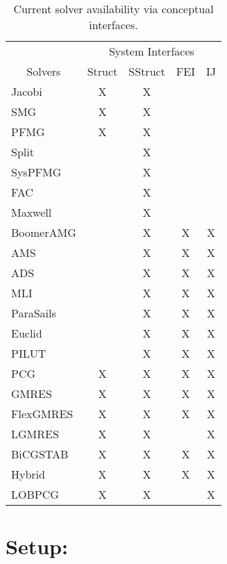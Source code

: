 \begin{table}[h]
\center
\begin{tabular}{|l||c|c|c|c|}
\hline
                               & \multicolumn{4}{|c|}{System Interfaces} \\
\multicolumn{1}{|c||}{Solvers} & Struct & SStruct & FEI & IJ \\
\hline\hline
Jacobi     & X & X &   &   \\
SMG        & X & X &   &   \\
PFMG       & X & X &   &   \\
Split      &   & X &   &   \\
SysPFMG    &   & X &   &   \\
FAC        &   & X &   &   \\
Maxwell    &   & X &   &   \\
BoomerAMG  &   & X & X & X \\
AMS        &   & X & X & X \\
ADS        &   & X & X & X \\
MLI        &   & X & X & X \\
ParaSails  &   & X & X & X \\
Euclid     &   & X & X & X \\
PILUT      &   & X & X & X \\
PCG        & X & X & X & X \\
GMRES      & X & X & X & X \\
FlexGMRES  & X & X & X & X \\
LGMRES     & X & X &   & X \\
BiCGSTAB   & X & X & X & X \\
Hybrid     & X & X & X & X \\
LOBPCG     & X & X &   & X \\
\hline
\end{tabular}
\caption{%
Current solver availability via \hypre{} conceptual interfaces.
}
\label{table-solver-availability}
\end{table}


\section*{Setup:}

